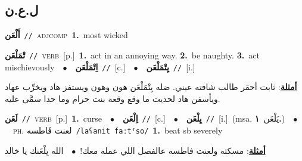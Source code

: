 \documentclass[10pt,a4paper,twoside]{article} %
\begin{document}
\begin{multicols}{2}
\vspace{-3mm}
\subsection*{\color{blue}\foreignlanguage{arabic}{ل.ع.ن}\color{blue}{}} 

{\setlength\topsep{0pt}\textbf{\foreignlanguage{arabic}{أَلْعَن}}\ {\color{gray}\texttt{//}\color{black}}\ \textsc{adj\textunderscore comp}\ \textbf{1.}~most wicked\ } \vspace{2mm}

{\setlength\topsep{0pt}\textbf{\foreignlanguage{arabic}{تْمَلْعَن}}\ {\color{gray}\texttt{//}\color{black}}\ \textsc{verb}\ [p.]\ \textbf{1.}~act in an annoying way.  \textbf{2.}~be naughty.  \textbf{3.}~act mischievously\ \ $\bullet$\ \ \setlength\topsep{0pt}\textbf{\foreignlanguage{arabic}{اِتْمَلْعَن}}\ {\color{gray}\texttt{//}\color{black}}\ [c.]\ \ $\bullet$\ \ \setlength\topsep{0pt}\textbf{\foreignlanguage{arabic}{يِتْمَلْعَن}}\ {\color{gray}\texttt{//}\color{black}}\ [i.]\  \begin{flushright}\color{gray}\foreignlanguage{arabic}{\textbf{\underline{\foreignlanguage{arabic}{أمثلة}}}: ثابت أحقر طالب شافته عيني. ضله يِتْمَلْعَن هون وهون ويستفز هاد ويخرِّب عهاد ويأسفن هاد لحديت ما وقع وقعة بنت حرام وما حدا سمَّى عليه.}\end{flushright}\color{black}} \vspace{2mm}

{\setlength\topsep{0pt}\textbf{\foreignlanguage{arabic}{لَعَن}}\ {\color{gray}\texttt{//}\color{black}}\ \textsc{verb}\ [p.]\ \textbf{1.}~curse\ \ $\bullet$\ \ \setlength\topsep{0pt}\textbf{\foreignlanguage{arabic}{اِلْعَن}}\ {\color{gray}\texttt{//}\color{black}}\ [c.]\ \ $\bullet$\ \ \setlength\topsep{0pt}\textbf{\foreignlanguage{arabic}{يِلْعَن}}\ {\color{gray}\texttt{//}\color{black}}\ [i.]\ \color{gray}(msa. \foreignlanguage{arabic}{يَلْعَن}~\foreignlanguage{arabic}{\textbf{١.}})\color{black}\ \ $\bullet$\ \ \textsc{ph.} \color{gray} \foreignlanguage{arabic}{لعنت فَاطسه}\color{black}\ {\color{gray}\texttt{/{\sffamily laʕanit faːtˤso}/}\color{black}}\ \textbf{1.}~beat sb severely\  \begin{flushright}\color{gray}\foreignlanguage{arabic}{\textbf{\underline{\foreignlanguage{arabic}{أمثلة}}}: مسكته ولعنت فاطسه عالفصل اللي عمله معك!\ $\bullet$\ \  الله يِلْعَنك يا خالد}\end{flushright}\color{black}} \vspace{2mm}


\end{multicols}
\end{document}
